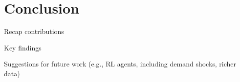 \section{Conclusion}
Recap contributions

Key findings

Suggestions for future work (e.g., RL agents, including demand shocks, richer data)